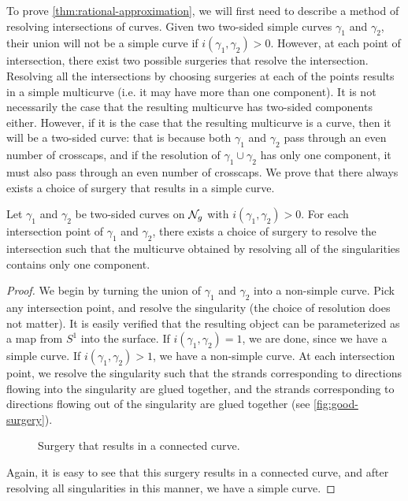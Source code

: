 \documentclass[12pt, reqno]{amsart}
\begin{document}
To prove \autoref{thm:rational-approximation}, we will first need to describe a method of resolving intersections of curves.
Given two two-sided simple curves $\gamma_1$ and $\gamma_2$, their union will not be a simple curve if $i(\gamma_1, \gamma_2) > 0$.
However, at each point of intersection, there exist two possible surgeries that resolve the intersection.
Resolving all the intersections by choosing surgeries at each of the points results in a simple multicurve (i.e. it may have more than one component).
It is not necessarily the case that the resulting multicurve has two-sided components either.
However, if it is the case that the resulting multicurve is a curve, then it will be a two-sided curve: that is because both $\gamma_1$ and $\gamma_2$ pass through an even number of crosscaps, and if the resolution of $\gamma_1 \cup \gamma_2$ has only one component, it must also pass through an even number of crosscaps.
We prove that there always exists a choice of surgery that results in a simple curve.
\begin{lemma}
  \label{lem:valid-surgery}
  Let $\gamma_1$ and $\gamma_2$ be two-sided curves on $\mathcal{N}_g$ with $i(\gamma_1, \gamma_2) > 0$.
  For each intersection point of $\gamma_1$ and $\gamma_2$, there exists a choice of surgery to resolve the intersection such that the multicurve obtained by resolving all of the singularities contains only one component.
\end{lemma}
\begin{proof}
  We begin by turning the union of $\gamma_1$ and $\gamma_2$ into a non-simple curve.
  Pick any intersection point, and resolve the singularity (the choice of resolution does not matter).
  It is easily verified that the resulting object can be parameterized as a map from $S^1$ into the surface.
  If $i(\gamma_1, \gamma_2) = 1$, we are done, since we have a simple curve.
  If $i(\gamma_1, \gamma_2) > 1$, we have a non-simple curve.
  At each intersection point, we resolve the singularity such that the strands corresponding to directions flowing into the singularity are glued together, and the strands corresponding to directions flowing out of the singularity are glued together (see \autoref{fig:good-surgery}).
  \begin{figure}[h]
    \centering
    \caption{Surgery that results in a connected curve.}
    \label{fig:good-surgery}
  \end{figure}
Again, it is easy to see that this surgery results in a connected curve, and after resolving all singularities in this manner, we have a simple curve.
\end{proof}
\end{document}
